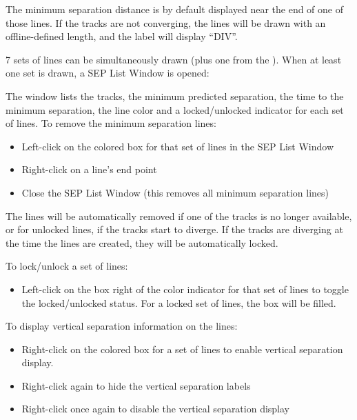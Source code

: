 \documentclass[a4paper,oneside,11pt]{memoir}
\begin{document}
\bigskip

The minimum separation distance is by default displayed near the end of one of those lines. If the tracks are not converging, the lines will be drawn with an offline-defined length, and the label will display “DIV”.

\bigskip

7 sets of lines can be simultaneously drawn (plus one from the ). When at least one set is drawn, a SEP List Window is opened:

\bigskip


The window lists the tracks, the minimum predicted separation, the time to the minimum separation, the line color and a locked/unlocked indicator for each set of lines.
To remove the minimum separation lines:

\begin{itemize}
    \item Left-click on the colored box for that set of lines in the SEP List Window
    \item Right-click on a line’s end point
    \item Close the SEP List Window (this removes all minimum separation lines)
\end{itemize}

The lines will be automatically removed if one of the tracks is no longer available, or for unlocked lines, if the tracks start to diverge. If the tracks are diverging at the time the lines are created, they will be automatically locked.

\bigskip

To lock/unlock a set of lines:

\begin{itemize}
    \item Left-click on the box right of the color indicator for that set of lines to toggle the locked/unlocked status. For a locked set of lines, the box will be filled.
\end{itemize}

\bigskip

To display vertical separation information on the lines:

\begin{itemize}
    \item Right-click on the colored box for a set of lines to enable vertical separation display.
    \item Right-click again to hide the vertical separation labels
    \item Right-click once again to disable the vertical separation display
\end{itemize}
\end{document}
